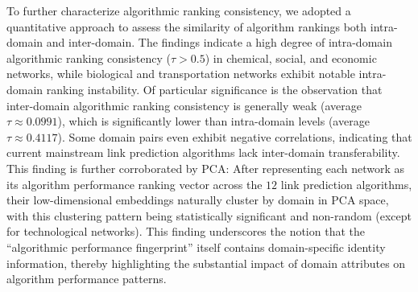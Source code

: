 \documentclass{article}
\begin{document}
To further characterize algorithmic ranking consistency, we adopted a quantitative approach to assess the similarity of algorithm rankings both intra-domain and inter-domain. The findings indicate a high degree of intra-domain algorithmic ranking consistency ($\tau > 0.5$) in chemical, social, and economic networks, while biological and transportation networks exhibit notable intra-domain ranking instability. Of particular significance is the observation that inter-domain algorithmic ranking consistency is generally weak (average $\tau \approx 0.0991$), which is significantly lower than intra-domain levels (average $\tau \approx 0.4117$). Some domain pairs even exhibit negative correlations, indicating that current mainstream link prediction algorithms lack inter-domain transferability. This finding is further corroborated by PCA: After representing each network as its algorithm performance ranking vector across the $12$ link prediction algorithms, their low-dimensional embeddings naturally cluster by domain in PCA space, with this clustering pattern being statistically significant and non-random (except for technological networks). This finding underscores the notion that the ``algorithmic performance fingerprint'' itself contains domain-specific identity information, thereby highlighting the substantial impact of domain attributes on algorithm performance patterns.
	
\end{document}
